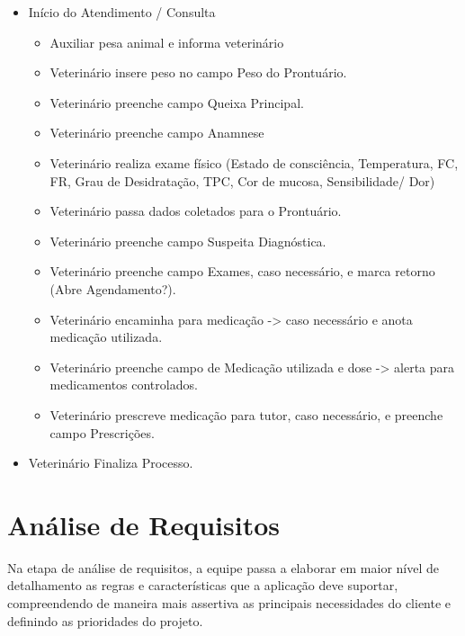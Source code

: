 \documentclass[
    12pt,               %
    openright,          %
    oneside,
    a4paper,            %
    BIBLATEX,           %
    TODO,               %
    english,            %
    brazil              %
    ]{ifsp-spo-inf-ctds}
\begin{document}
    \begin{itemize}
        \item Início do Atendimento / Consulta 

        \begin{itemize}
            \item Auxiliar pesa animal e informa veterinário
            \item Veterinário insere peso no campo Peso do Prontuário.
            \item Veterinário preenche campo Queixa Principal.
            \item Veterinário preenche campo Anamnese 
            \item Veterinário realiza exame físico (Estado de consciência, Temperatura, FC, FR, Grau de Desidratação, TPC, Cor de mucosa, Sensibilidade/ Dor)
            \item Veterinário passa dados coletados para o Prontuário.
            \item Veterinário preenche campo Suspeita Diagnóstica.
            \item Veterinário preenche campo Exames, caso necessário, e marca retorno (Abre Agendamento?).
            \item Veterinário encaminha para medicação -> caso necessário e anota medicação utilizada.
            \item Veterinário preenche campo de Medicação utilizada e dose -> alerta para medicamentos controlados.
            \item Veterinário prescreve medicação para tutor, caso necessário, e preenche campo Prescrições.

        \end{itemize}
        \item Veterinário Finaliza Processo.
    \end{itemize}

	
  



     
    \section{Análise de Requisitos}

        Na etapa de análise de requisitos, a equipe passa a elaborar em maior nível de detalhamento as regras e características que a aplicação deve suportar, compreendendo de maneira mais assertiva as principais necessidades do cliente e definindo as prioridades do projeto.
\end{document}
